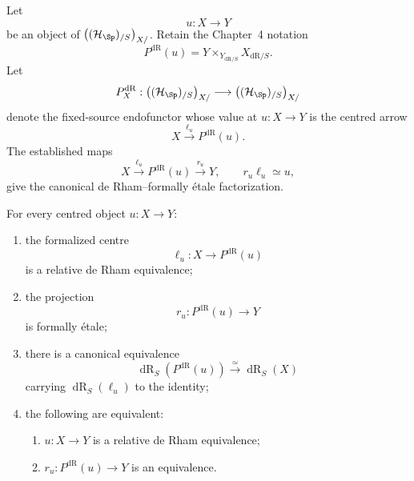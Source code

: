 \begin{definition}
\label{def:centred-dr-formalization}
Let
\[
    u:X\longrightarrow Y
\]
be an object of $\bigl((\mathcal H_{\Sp})_{/S}\bigr)_{X/}$.  Retain the Chapter~4 notation
\[
    P^{\mathrm{dR}}(u)
    =
    Y\times_{Y_{\mathrm{dR}/S}}X_{\mathrm{dR}/S}.
\]
Let
\[
    P_X^{\mathrm{dR}}:
    \bigl((\mathcal H_{\Sp})_{/S}\bigr)_{X/}
    \longrightarrow
    \bigl((\mathcal H_{\Sp})_{/S}\bigr)_{X/}
\]
denote the fixed-source endofunctor whose value at
$u:X\to Y$ is the centred arrow
\[
    X\xrightarrow{\ell_u}P^{\mathrm{dR}}(u).
\]
The established maps
\[
    X
    \xrightarrow{\ell_u}
    P^{\mathrm{dR}}(u)
    \xrightarrow{r_u}
    Y,
    \qquad
    r_u\ell_u\simeq u,
\]
give the canonical de Rham--formally \'etale factorization.
\end{definition}

\begin{proposition}
\label{prop:centred-formalization-recognition}
For every centred object $u:X\to Y$:
\begin{enumerate}
    \item the formalized centre
    \[
        \ell_u:X\longrightarrow P^{\mathrm{dR}}(u)
    \]
    is a relative de Rham equivalence;
    \item the projection
    \[
        r_u:P^{\mathrm{dR}}(u)\longrightarrow Y
    \]
    is formally \'etale;
    \item there is a canonical equivalence
    \[
        \operatorname{dR}_S(P^{\mathrm{dR}}(u))
        \xrightarrow{\simeq}
        \operatorname{dR}_S(X)
    \]
    carrying $\operatorname{dR}_S(\ell_u)$ to the identity;
    \item the following are equivalent:
    \begin{enumerate}
        \item $u:X\to Y$ is a relative de Rham equivalence;
        \item $r_u:P^{\mathrm{dR}}(u)\to Y$ is an equivalence.
    \end{enumerate}
\end{enumerate}
\end{proposition}

